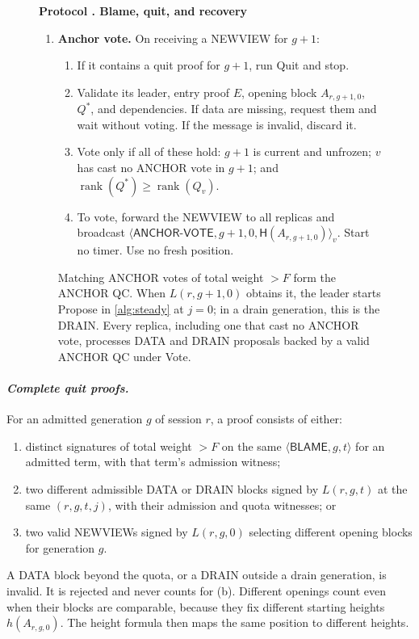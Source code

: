\documentclass[11pt,a4paper]{article}
\newcommand{\RR}[1]{{\color{rrRed}#1}}
\newcommand{\Hash}{\mathsf H}
\newcommand{\rank}{\operatorname{rank}}
\newcommand{\tagg}[1]{\ensuremath{\mathsf{#1}}}
\newcommand{\defterm}[1]{\textcolor{rrBlue}{\textit{#1}}}
\newcounter{protocol}
\newenvironment{protocol}[2]{\begin{figure}[htbp]\refstepcounter{protocol}\label{#1}
\begin{mdframed}[linewidth=.6pt,skipabove=0pt,skipbelow=0pt,
innertopmargin=7pt,innerbottommargin=7pt]\small
\textbf{Protocol \theprotocol. #2}\par\smallskip}{\end{mdframed}\end{figure}}
\begin{document}
\begin{protocol}{alg:recovery}{Blame, quit, and recovery}
\begin{enumerate}[label=\textbf{\arabic*)},itemsep=3pt]
\item \textbf{Anchor vote.} On receiving a NEWVIEW for $g+1$:
 \begin{enumerate}[label=(\alph*)]
 \item If it contains a quit proof for $g+1$, run Quit and stop.
 \item Validate its leader, entry proof $E$, opening block $A_{r,g+1,0}$,
       $Q^*$, and dependencies. If data are missing, request them and
       wait without voting. If the message is invalid, discard it.
 \item Vote only if all of these hold: $g+1$ is current and unfrozen; $v$
       has cast no ANCHOR vote in $g+1$; and $\rank(Q^*)\ge\rank(Q_v)$.
 \item To vote, forward the NEWVIEW to all replicas and broadcast
       $\langle\tagg{ANCHOR\mbox{-}VOTE},g+1,0,\Hash(A_{r,g+1,0})\rangle_v$.
       Start no timer. Use no fresh position.
 \end{enumerate}
 Matching ANCHOR votes \RR{of total weight $>F$} form the ANCHOR QC.
 When $L(r,g+1,0)$ obtains it, the leader starts Propose in
 \cref{alg:steady} at $j=0$\RR{; in a drain generation, this is the
 DRAIN}. Every replica, including one that cast no ANCHOR vote,
 processes DATA \RR{and DRAIN} proposals backed by a valid ANCHOR QC
 under Vote.
\end{enumerate}
\end{protocol}

\paragraph{\defterm{Complete quit proofs.}}
For an admitted generation $g$ \RR{of session $r$}, a proof consists of
either:
\begin{enumerate}[label=(\alph*)]
\item distinct signatures \RR{of total weight $>F$} on the same
$\langle\tagg{BLAME},g,t\rangle$ for an admitted term, with that term's
admission witness;
\item two different admissible DATA \RR{or DRAIN} blocks signed by
$L(r,g,t)$ at the same $(r,g,t,j)$, with their admission \RR{and quota}
witnesses; or
\item two valid NEWVIEWs signed by $L(r,g,0)$ selecting different opening
blocks for generation $g$.
\end{enumerate}
\RR{A DATA block beyond the quota, or a DRAIN outside a drain generation,
is invalid. It is rejected and never counts for (b).}
Different openings count even when their blocks are comparable, because
they fix different starting heights $h(A_{r,g,0})$. The height formula then
maps the same position to different heights.
\end{document}
